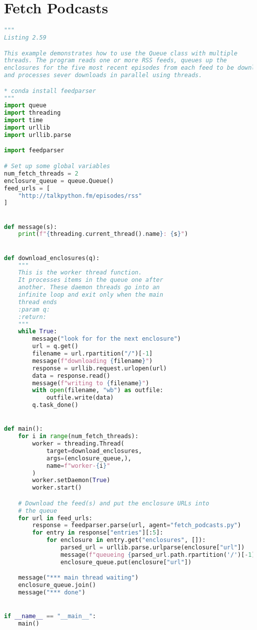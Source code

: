 \documentclass[a4paper,landscape]{report}
\begin{document}
\section{Fetch Podcasts}
\begin{lstlisting}[language=Python]
"""
Listing 2.59

This example demonstrates how to use the Queue class with multiple
threads. The program reads one or more RSS feeds, queues up the
enclosures for the five most recent episodes from each feed to be downloaded,
and processes sever downloads in parallel using threads.

* conda install feedparser
"""
import queue
import threading
import time
import urllib
import urllib.parse

import feedparser

# Set up some global variables
num_fetch_threads = 2
enclosure_queue = queue.Queue()
feed_urls = [
    "http://talkpython.fm/episodes/rss"
]


def message(s):
    print(f"{threading.current_thread().name}: {s}")


def download_enclosures(q):
    """
    This is the worker thread function.
    It processes items in the queue one after
    another. These daemon threads go into an
    infinite loop and exit only when the main
    thread ends
    :param q:
    :return:
    """
    while True:
        message("look for for the next enclosure")
        url = q.get()
        filename = url.rpartition("/")[-1]
        message(f"downloading {filename}")
        response = urllib.request.urlopen(url)
        data = response.read()
        message(f"writing to {filename}")
        with open(filename, "wb") as outfile:
            outfile.write(data)
        q.task_done()


def main():
    for i in range(num_fetch_threads):
        worker = threading.Thread(
            target=download_enclosures,
            args=(enclosure_queue,),
            name=f"worker-{i}"
        )
        worker.setDaemon(True)
        worker.start()

    # Download the feed(s) and put the enclosure URLs into
    # the queue
    for url in feed_urls:
        response = feedparser.parse(url, agent="fetch_podcasts.py")
        for entry in response["entries"][:5]:
            for enclosure in entry.get("enclosures", []):
                parsed_url = urllib.parse.urlparse(enclosure["url"])
                message(f"queueing {parsed_url.path.rpartition('/')[-1]}")
                enclosure_queue.put(enclosure["url"])

    message("*** main thread waiting")
    enclosure_queue.join()
    message("*** done")


if __name__ == "__main__":
    main()

\end{lstlisting}
\end{document}
